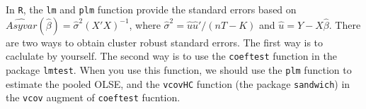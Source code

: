 \documentclass[
  12pt,
]{article}
\newenvironment{Shaded}{\begin{snugshade}}{\end{snugshade}}
\newcommand{\CommentTok}[1]{\textcolor[rgb]{0.56,0.35,0.01}{\textit{#1}}}
\newcommand{\ControlFlowTok}[1]{\textcolor[rgb]{0.13,0.29,0.53}{\textbf{#1}}}
\newcommand{\DataTypeTok}[1]{\textcolor[rgb]{0.13,0.29,0.53}{#1}}
\newcommand{\DecValTok}[1]{\textcolor[rgb]{0.00,0.00,0.81}{#1}}
\newcommand{\KeywordTok}[1]{\textcolor[rgb]{0.13,0.29,0.53}{\textbf{#1}}}
\newcommand{\NormalTok}[1]{#1}
\newcommand{\OperatorTok}[1]{\textcolor[rgb]{0.81,0.36,0.00}{\textbf{#1}}}
\newcommand{\StringTok}[1]{\textcolor[rgb]{0.31,0.60,0.02}{#1}}
\begin{document}
In \texttt{R}, the \texttt{lm} and \texttt{plm} function provide the standard errors based on \(\widehat{Asyvar}(\hat{\beta}) = \hat{\sigma}^2 (X'X)^{-1}\),
where \(\hat{\sigma}^2 = \hat{u}\hat{u}'/(nT - K)\) and \(\hat{u} = Y - X \hat{\beta}\).
There are two ways to obtain cluster robust standard errors.
The first way is to caclulate by yourself.
The second way is to use the \texttt{coeftest} function in the package \texttt{lmtest}.
When you use this function,
we should use the \texttt{plm} function to estimate the pooled OLSE, and
the \texttt{vcovHC} function (the package \texttt{sandwich}) in the \texttt{vcov} augment of \texttt{coeftest} fucntion.

\begin{Shaded}
\end{Shaded}
\end{document}

